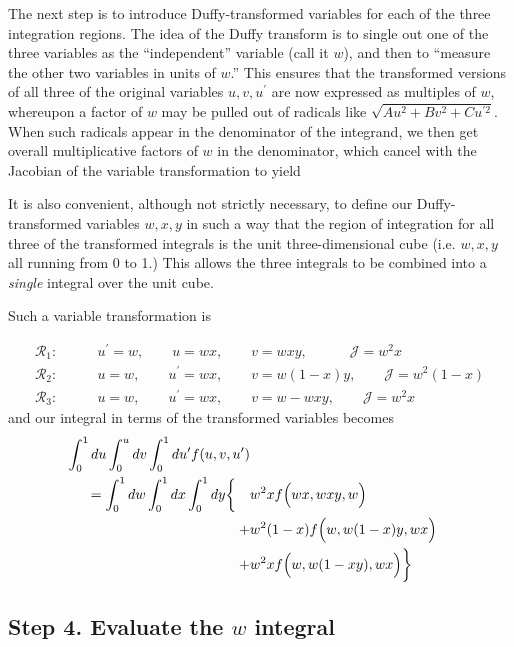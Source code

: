 \documentclass[letterpaper]{article}
\begin{document}
The next step is to introduce Duffy-transformed variables for each 
of the three integration regions. The idea of the Duffy transform
is to single out one of the three variables as the ``independent''
variable (call it $w$), and then to ``measure the other two variables
in units of $w$.'' This ensures that the transformed versions of 
all three of the original variables $u,v,u^\prime$ are now expressed
as multiples of $w$, whereupon a factor of $w$ may be pulled out 
of radicals like $\sqrt{Au^2 + Bv^2 + Cu^{\prime 2}}$. When such radicals
appear in the denominator of the integrand, we then get overall 
multiplicative factors of $w$ in the denominator, which cancel with
the Jacobian of the variable transformation to yield 

It is also convenient, although not strictly necessary, to define our
Duffy-transformed variables $w,x,y$ in such a way that the region of
integration for all three of the transformed integrals is the unit
three-dimensional cube (i.e. $w,x,y$ all running from 0 to 1.) This 
allows the three integrals to be combined into a \textit{single} integral 
over the unit cube.

Such a variable transformation is 

\begin{align*}
\mathcal{R}_1:\qquad
    &u^\prime=w, \qquad u=wx, \qquad v=wxy, \quad \qquad \mathcal{J}=w^2 x
\\
\mathcal{R}_2: \qquad 
    &u=w, \qquad u^\prime=wx, \qquad v=w(1-x)y, \qquad \mathcal{J}=w^2 (1-x)
\\
\mathcal{R}_3: \qquad 
    &u=w, \qquad u^\prime=wx, \qquad v=w-wxy, \qquad \mathcal{J}= w^2x
\end{align*}
and our integral in terms of the transformed variables becomes
\begin{align}
\int_0^1 du \int_0^u dv \int_0^1 du^\prime f(u,v,u^\prime)
\nonumber \\
=\int_0^1 dw \int_0^1 dx \int_0^1 dy 
  \bigg\{\quad & w^2 x f\Big(wx, wxy, w\Big)
\nonumber \\
       + &w^2(1-x) f\Big(w, w(1-x)y, wx\Big)
\nonumber \\
       + &w^2x  f\Big(w, w(1-xy), wx\Big)
  \bigg\}
\label{TransformedEdgePanelIntegral1}
\end{align}

\subsection*{Step 4. Evaluate the $w$ integral}
\end{document}
